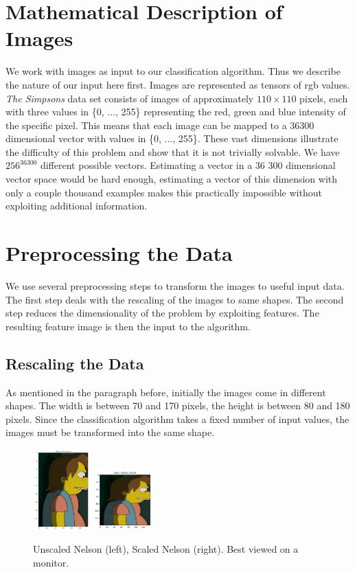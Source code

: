 \documentclass[journal, a4paper]{IEEEtran}
\begin{document}
\section{Mathematical Description of Images}
We work with images as input to our classification algorithm. Thus we describe the nature of our input here first.
Images are represented as tensors of rgb values. \textit{The Simpsons} data set consists of images of approximately \( 110 \times 110 \) pixels, each with three values in \{0, ..., 255\} representing the red, green and blue intensity of the specific pixel. This means that each image can be mapped to a 36300 dimensional vector with values in \{0, ..., 255\}. 
These vast dimensions illustrate the difficulty of this problem and show that it is not trivially solvable. We have \( 256^{36300}\) different possible vectors. 
Estimating a vector in a 36 300 dimensional vector space would be hard enough, estimating a vector of this dimension with only a couple thousand examples makes this practically impossible without exploiting additional information.

\section{Preprocessing the Data}

We use several preprocessing steps to transform the images to useful input data. The first step deals with the rescaling of the images to same shapes. The second step reduces the dimensionality of the problem by exploiting features. The resulting feature image is then the input to the algorithm.
\newline

\subsection{Rescaling the Data}
As mentioned in the paragraph before, initially the images come in different shapes. The width is between 70 and 170 pixels, the height is between 80 and 180 pixels. Since the classification algorithm takes a fixed number of input values, the images must be transformed into the same shape. 
\begin{figure}[!ht]
	\centering
  \includegraphics[width=0.2\textwidth]{Image4.png}
  \includegraphics[width=0.2\textwidth]{Image5.png}
	\caption{Unscaled Nelson (left), Scaled Nelson (right). Best viewed on a monitor.}
	\label{fig7}
\end{figure}
\end{document}

